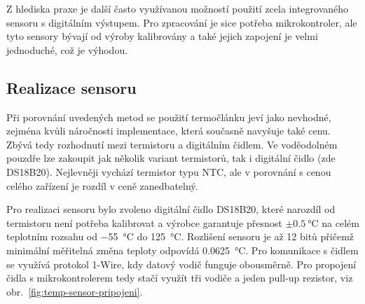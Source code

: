         Z hlediska praxe je další často využívanou možností použití zcela integrovaného sensoru s digitálním výstupem. Pro zpracování je sice potřeba mikrokontroler, ale tyto sensory bývají od výroby kalibrovány a také jejich zapojení je velmi jednoduché, což je výhodou.

    \subsection{Realizace sensoru}
        Při porovnání uvedených metod se použití termočlánku jeví jako nevhodné, zejména kvůli náročnosti implementace, která současně navyšuje také cenu. Zbývá tedy rozhodnutí mezi termistoru a digitálním čidlem. Ve voděodolném pouzdře lze zakoupit jak několik variant termistorů, tak i digitální čidlo (zde DS18B20). Nejlevněji vychází termistor typu NTC, ale v porovnání s cenou celého zařízení je rozdíl v ceně zanedbatelný. 
        
        Pro realizaci sensoru bylo zvoleno digitální čidlo DS18B20, které narozdíl od termistoru není potřeba kalibrovat a výrobce garantuje přesnost \(\pm \qty{0.5}{\degreeCelsius}\) na celém teplotním rozsahu od \qty{-55}{\degreeCelsius} do \qty{+125}{\degreeCelsius}. Rozlišení sensoru je až 12 bitů přičemž minimální měřitelná změna teploty odpovídá \qty{0.0625}{\degreeCelsius}. Pro komunikace s čidlem se využívá protokol 1-Wire, kdy datový vodič funguje obousměrně. Pro propojení čidla s mikrokontrolerem tedy stačí využít tři vodiče a jeden pull-up rezistor, viz obr.~\ref{fig:temp-sensor-pripojeni}.


